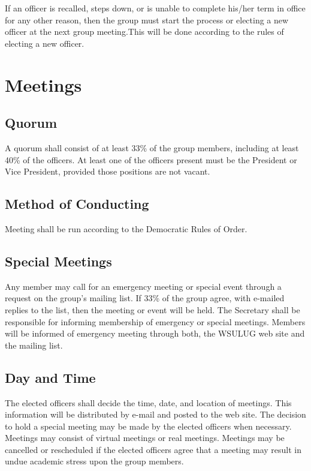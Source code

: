 \documentclass{article}
\begin{document}
If an officer is recalled, steps down, or is unable to complete his/her
term in office for any other reason, then the group must start the
process or electing a new officer at the next group meeting.This will
be done according to the rules of electing a new officer.


\section{Meetings}
\subsection{Quorum}
A quorum shall consist of at least 33\% of the group members, including
at least 40\% of the officers.  At least one of the officers present must
be the President or Vice President, provided those positions are not vacant.

\subsection{Method of Conducting}
Meeting shall be run according to the Democratic Rules of Order.

\subsection{Special Meetings}
Any member may call for an emergency meeting or special event through a
request on the group's mailing list.  If 33\% of the group agree, with
e-mailed replies to the list, then the meeting or event will be held.
The Secretary shall be responsible for informing membership of emergency
or special meetings. Members will be informed of emergency meeting
through both, the WSULUG web site and the mailing list.

\subsection{Day and Time}
The elected officers shall decide the time, date, and location of
meetings. This information will be distributed by e-mail and posted
to the web site. The decision to hold a special meeting may be made
by the elected officers when necessary. Meetings may consist of
virtual meetings or real meetings. Meetings may be cancelled or
rescheduled if the elected officers agree that a meeting may
result in undue academic stress upon the group members.
\end{document}
